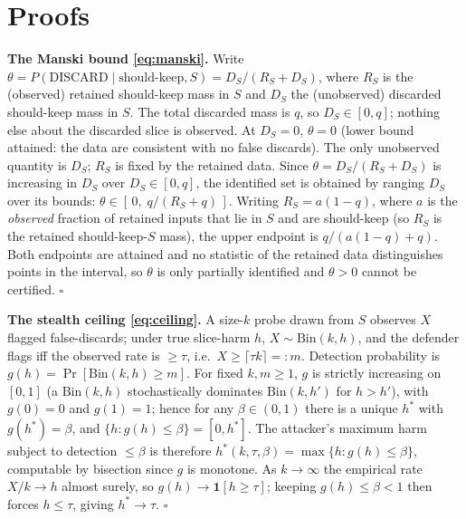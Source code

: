 \documentclass[conference]{IEEEtran}
\begin{document}
\appendices
\section{Proofs}

\noindent\textbf{The Manski bound \eqref{eq:manski}.} Write $\theta = P(\text{DISCARD}\mid\text{should-keep},S) =
D_S/(R_S+D_S)$, where $R_S$ is the (observed) retained should-keep mass in $S$ and $D_S$ the (unobserved)
discarded should-keep mass in $S$. The total discarded mass is $q$, so $D_S\in[0,q]$; nothing else about the
discarded slice is observed. At $D_S=0$, $\theta=0$ (lower bound attained: the data are consistent with no
false discards). The only unobserved quantity is $D_S$; $R_S$ is fixed by the
retained data. Since $\theta=D_S/(R_S+D_S)$ is increasing in $D_S$ over $D_S\in[0,q]$, the identified set is
obtained by ranging $D_S$ over its bounds: $\theta\in[\,0,\;q/(R_S+q)\,]$. Writing $R_S=a(1-q)$, where $a$ is
the \emph{observed} fraction of retained inputs that lie in $S$ and are should-keep (so $R_S$ is the retained
should-keep-$S$ mass), the upper endpoint is $q/(a(1-q)+q)$. Both endpoints are attained and no statistic of the
retained data distinguishes points in the interval, so $\theta$ is only partially identified and $\theta>0$
cannot be certified. \hfill$\square$

\medskip
\noindent\textbf{The stealth ceiling \eqref{eq:ceiling}.} A size-$k$ probe drawn from $S$ observes $X$ flagged
false-discards; under true slice-harm $h$, $X\sim\mathrm{Bin}(k,h)$, and the defender flags iff the observed
rate is $\geq\tau$, i.e.\ $X\geq\lceil\tau k\rceil=:m$. Detection probability is $g(h)=\Pr[\mathrm{Bin}(k,h)\geq
m]$. For fixed $k,m\geq1$, $g$ is strictly increasing on $[0,1]$ (a $\mathrm{Bin}(k,h)$ stochastically
dominates $\mathrm{Bin}(k,h')$ for $h>h'$), with $g(0)=0$ and $g(1)=1$; hence for any $\beta\in(0,1)$ there is
a unique $h^\ast$ with $g(h^\ast)=\beta$, and $\{h:g(h)\le\beta\}=[0,h^\ast]$. The attacker's maximum harm
subject to detection $\le\beta$ is therefore $h^\ast(k,\tau,\beta)=\max\{h:g(h)\le\beta\}$, computable by
bisection since $g$ is monotone. As $k\to\infty$ the empirical rate $X/k\to h$ almost surely, so $g(h)\to
\mathbf{1}[h\geq\tau]$; keeping $g(h)\le\beta<1$ then forces $h\le\tau$, giving $h^\ast\to\tau$.
\hfill$\square$
\end{document}
